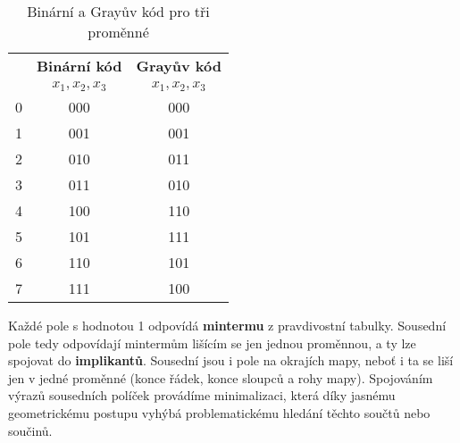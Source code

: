      \begin{table}[ht!] 
       \centering 
       \begin{tabular}{|c|c|c|}
         \hline
           \rowcolor{CornflowerBlue}{\textbf{Číslo}}  & \textbf{Binární kód} & \textbf{Grayův kód}    \\
           \rowcolor{CornflowerBlue}{ }               &     {$x_1,x_2,x_3$}  &    {$x_1,x_2,x_3$}     \\
          \hline\hline  
             \cellcolor[gray]{0.9}0                   & 000                  & 000                    \\    
          \hline       
             \cellcolor[gray]{0.9}1                   & 001                  & 001                    \\    
          \hline  
             \cellcolor[gray]{0.9}2                   & 010                  & 011                    \\    
          \hline  
             \cellcolor[gray]{0.9}3                   & 011                  & 010                    \\    
          \hline  
             \cellcolor[gray]{0.9}4                   & 100                  & 110                    \\    
          \hline        
             \cellcolor[gray]{0.9}5                   & 101                  & 111                    \\    
          \hline  
             \cellcolor[gray]{0.9}6                   & 110                  & 101                    \\    
          \hline  
             \cellcolor[gray]{0.9}7                   & 111                  & 100                    \\    
          \hline                                               
       \end{tabular}
       \caption{Binární a Grayův kód pro tři proměnné}
       \label{CES:BCD_Gray_c}    
     \end{table}       
      
     Každé pole s hodnotou 1 odpovídá \textbf{mintermu} z pravdivostní tabulky. Sousední pole tedy odpovídají mintermům lišícím
     se jen jednou proměnnou, a ty lze spojovat do \textbf{implikantů}. Sousední jsou i pole na okrajích mapy, neboť i ta se liší
     jen v jedné proměnné (konce řádek, konce sloupců a rohy mapy). Spojováním výrazů sousedních políček provádíme minimalizaci,
     která díky jasnému geometrickému postupu vyhýbá problematickému hledání těchto součtů nebo součinů. 
     
